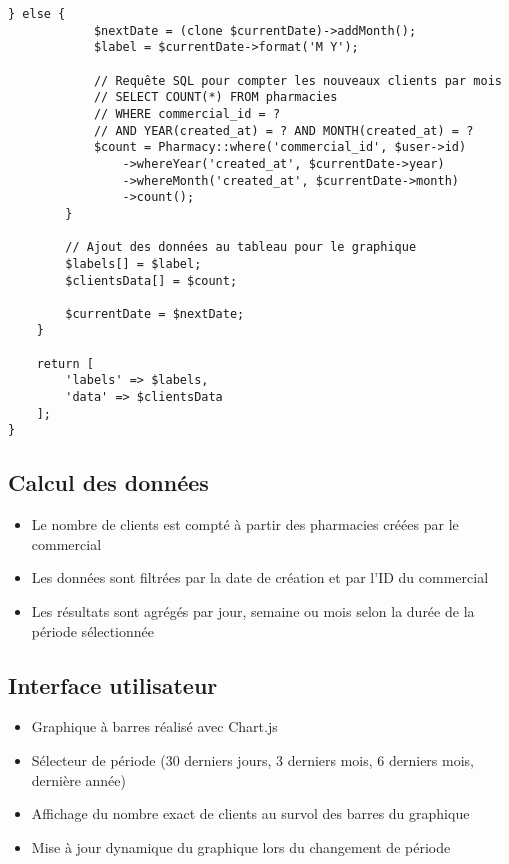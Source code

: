 \documentclass[12pt,a4paper]{article}
\begin{document}
\begin{lstlisting}[caption=Méthode prepareClientsChartData]
        } else {
            $nextDate = (clone $currentDate)->addMonth();
            $label = $currentDate->format('M Y');
            
            // Requête SQL pour compter les nouveaux clients par mois
            // SELECT COUNT(*) FROM pharmacies 
            // WHERE commercial_id = ? 
            // AND YEAR(created_at) = ? AND MONTH(created_at) = ?
            $count = Pharmacy::where('commercial_id', $user->id)
                ->whereYear('created_at', $currentDate->year)
                ->whereMonth('created_at', $currentDate->month)
                ->count();
        }
        
        // Ajout des données au tableau pour le graphique
        $labels[] = $label;
        $clientsData[] = $count;
        
        $currentDate = $nextDate;
    }
    
    return [
        'labels' => $labels,
        'data' => $clientsData
    ];
}
\end{lstlisting}

\subsection{Calcul des données}
\begin{itemize}
    \item Le nombre de clients est compté à partir des pharmacies créées par le commercial
    \item Les données sont filtrées par la date de création et par l'ID du commercial
    \item Les résultats sont agrégés par jour, semaine ou mois selon la durée de la période sélectionnée
\end{itemize}

\subsection{Interface utilisateur}
\begin{itemize}
    \item Graphique à barres réalisé avec Chart.js
    \item Sélecteur de période (30 derniers jours, 3 derniers mois, 6 derniers mois, dernière année)
    \item Affichage du nombre exact de clients au survol des barres du graphique
    \item Mise à jour dynamique du graphique lors du changement de période
\end{itemize}
\end{document}
